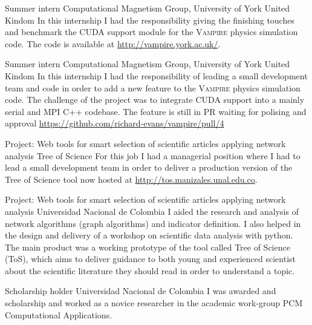 \documentclass[12pt,english]{moderncv}
\begin{document}
        {Summer intern}
        {Computational Magnetism Group, University of York}
        {United Kindom}
        {}
        {%
            In this internship I had the responsibility giving the finishing
            touches and benchmark the CUDA support module for the
            \textsc{Vampire} physics simulation code. The code is available
            at \url{http://vampire.york.ac.uk/}.
        }

        {Summer intern}
        {Computational Magnetism Group, University of York}
        {United Kindom}
        {}
        {%
            In this internship I had the responsibility of leading a small
            development team and code in order to add a new feature to the
            \textsc{Vampire} physics simulation code. The challenge of the
            project was to integrate CUDA support into a mainly serial and MPI
            C++ codebase. The feature is still in PR waiting for polising and
            approval \url{https://github.com/richard-evans/vampire/pull/4}
        }

        {Project: Web tools for smart selection of scientific articles applying network analysis}
        {Tree of Science}
        {}
        {}
        {%
            For this job I had a managerial position where I had to lead a
            small development team in order to deliver a production version of
            the Tree of Science tool now hosted at
            \url{http://tos.manizales.unal.edu.co}.
        }

        {Project: Web tools for smart selection of scientific articles applying network analysis}
        {Universidad Nacional de Colombia}
        {}
        {}
        {%
            I aided the research and analysis of network algorithms (graph
            algorithms) and indicator definition. I also helped in the design
            and delivery of a workshop on scientific data analysis with python.
            The main product was a working prototype of the tool called Tree of
            Science (ToS), which aims to deliver guidance to both young and
            experienced scientist about the scientific literature they should
            read in order to understand a topic.
        }

        {Scholarship holder}
        {Universidad Nacional de Colombia}
        {}
        {}
        {%
            I was awarded and scholarship and worked as a novice researcher in
            the academic work-group PCM Computational Applications.
        }
\end{document}
